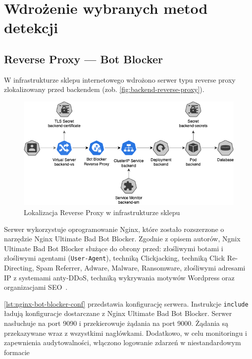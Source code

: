 \newpage


\section{Wdrożenie wybranych metod detekcji}\label{sec:wdrozenie-metod-detekcji}

\subsection{Reverse Proxy --- Bot Blocker}\label{subsec:reverse-proxy-impl}

W infrastrukturze sklepu internetowego wdrożono serwer typu reverse proxy zlokalizowany przed backendem (zob. \autoref{fig:backend-reverse-proxy}).

\begin{figure}[H]
    \centering
    \captionsetup{width=.8\linewidth}
    \includegraphics[width=\textwidth]{img/backend-reverse-proxy}
    \caption{Lokalizacja Reverse Proxy w infrastrukturze sklepu}
    \label{fig:backend-reverse-proxy}
\end{figure}

Serwer wykorzystuje oprogramowanie Nginx, które zostało rozszerzone o narzędzie Nginx Ultimate Bad Bot Blocker.
Zgodnie z opisem autorów, Ngnix Ultimate Bad Bot Blocker służące do obrony przed:
złośliwymi botami i złośliwymi agentami (\texttt{User-Agent}),
techniką Clickjacking, techniką Click Re-Directing,
Spam Referrer, Adware, Malware, Ransomware,
złośliwymi adresami IP z systemami anty-DDoS,
techniką wykrywania motywów Wordpress
oraz organizacjami SEO~\cite{nginx-ultimate-bad-bot-blocker}.

\autoref{lst:nginx-bot-blocker-conf} przedstawia konfigurację serwera.
Instrukcje \texttt{include} ładują konfiguracje dostarczane z Nginx Ultimate Bad Bot Blocker.
Serwer nasłuchuje na port 9090 i przekierowuje żądania na port 9000.
Żądania są przekazywane wraz z wszystkimi nagłówkami.
Dodatkowo, w celu monitoringu i zapewnienia audytowalności, włączono logowanie zdarzeń w niestandardowym formacie

